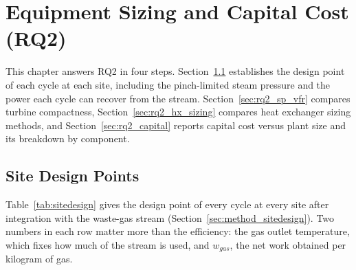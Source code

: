 \chapter{Equipment Sizing and Capital Cost (RQ2)}
\label{ch:results_rq2}

This chapter answers RQ2 in four steps. Section~\ref{sec:rq2_sitedesign}
establishes the design point of each cycle at each site, including the
pinch-limited steam pressure and the power each cycle can recover from the
stream. Section~\ref{sec:rq2_sp_vfr} compares turbine compactness,
Section~\ref{sec:rq2_hx_sizing} compares heat exchanger sizing methods, and
Section~\ref{sec:rq2_capital} reports capital cost versus plant size and its
breakdown by component.

\section{Site Design Points}
\label{sec:rq2_sitedesign}

Table~\ref{tab:sitedesign} gives the design point of every cycle at every
site after integration with the waste-gas stream
(Section~\ref{sec:method_sitedesign}). Two numbers in each row matter more
than the efficiency: the gas outlet temperature, which fixes how much of the
stream is used, and $w_{gas}$, the net work obtained per kilogram of gas.

